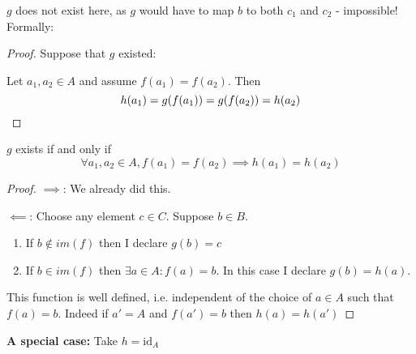 \documentclass[twoside]{scrartcl}
\begin{document}
\begin{example}

\begin{center}
\end{center}

$g$ does not exist here, as $g$ would have to map $b$ to both $c_1$ and $c_2$ - impossible! Formally: 

\begin{proof}

Suppose that $g$ existed: 

Let $a_1, a_2 \in A$ and assume $f(a_1)= f(a_2)$. Then 
\[h(a_1) = g(f(a_1)) = g(f(a_2)) = h(a_2)\qedhere\]
\end{proof}
\end{example}

\begin{theorem}
$g$ exists if and only if 
\[\forall a_1,a_2 \in A, f(a_1) = f(a_2) \implies h(a_1) = h(a_2)\]	
\end{theorem}
\begin{proof}
$\implies$: We already did this. 

$\impliedby$: Choose any element $c \in C$. Suppose $b \in B$.
\begin{enumerate}
\item If $b \not\in im(f)$ then I declare $g(b) = c$	
\item If $b \in im(f)$ then $\exists a \in A: f(a) = b$. In this case I declare $g(b) = h(a)$. 
\end{enumerate}
This function is well defined, i.e. independent of the choice of $a \in A$ such that $f(a) = b$. Indeed if $a' = A$ and $f(a') = b$ then $h(a) = h(a')$
\end{proof}

\textbf{A special case:} Take $h = \text{id}_A$
\begin{center}
\end{center}
\end{document}
